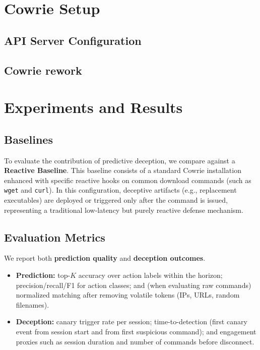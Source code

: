 \documentclass[10pt,a4paper,twocolumn]{article}
\begin{document}
\section{Cowrie Setup}

\subsection{API Server Configuration}

\subsection{Cowrie rework}

\section{Experiments and Results}
\label{sec:experiments-results}

\subsection{Baselines}
To evaluate the contribution of predictive deception, we compare against a \textbf{Reactive Baseline}.
This baseline consists of a standard Cowrie installation enhanced with specific reactive hooks on common download commands (such as \texttt{wget} and \texttt{curl}). In this configuration, deceptive artifacts (e.g., replacement executables) are deployed or triggered only after the command is issued, representing a traditional low-latency but purely reactive defense mechanism.

\subsection{Evaluation Metrics}
We report both \textbf{prediction quality} and \textbf{deception outcomes}.
\begin{itemize}
    \item \textbf{Prediction:} top-$K$ accuracy over action labels within the horizon; precision/recall/F1 for action classes; and (when evaluating raw commands) normalized matching after removing volatile tokens (IPs, URLs, random filenames).
    \item \textbf{Deception:} canary trigger rate per session; time-to-detection (first canary event from session start and from first suspicious command); and engagement proxies such as session duration and number of commands before disconnect.
\end{itemize}
\end{document}

